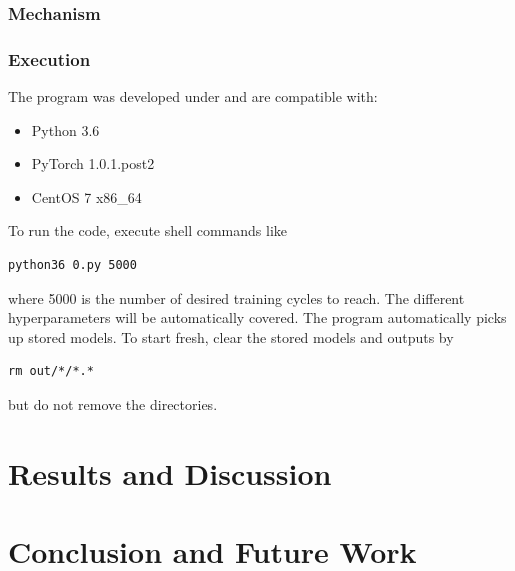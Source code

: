 \documentclass[runningheads]{llncs}
\begin{document}
\subsubsection{Mechanism} 

\subsubsection{Execution}

The program was developed under and are compatible with:
\begin{itemize}
\item Python 3.6
\item PyTorch 1.0.1.post2
\item CentOS 7 x86\_64
\end{itemize}
To run the code, execute shell commands like
\begin{verbatim}
python36 0.py 5000
\end{verbatim}
where 5000 is the number of desired training cycles to reach.
The different hyperparameters will be automatically covered.
The program automatically picks up stored models.
To start fresh, clear the stored models and outputs by
\begin{verbatim}
rm out/*/*.*
\end{verbatim}
but do not remove the directories.


\section{Results and Discussion}

\section{Conclusion and Future Work}
\end{document}
